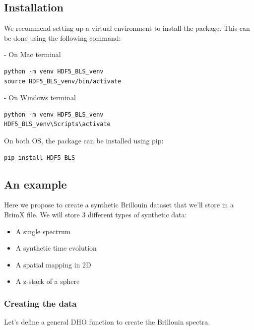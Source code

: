 \documentclass{article}
\begin{document}
\subsection{Installation}

We recommend setting up a virtual environment to install the package. This can be done using the following command:

\begin{tcolorbox}[colback=blue!5, colframe=blue!40!black, boxrule=0.5mm, sharp corners, left=2mm, right=2mm, top=1mm, bottom=1mm]
- On Mac terminal
\begin{lstlisting}
python -m venv HDF5_BLS_venv
source HDF5_BLS_venv/bin/activate 
\end{lstlisting}
\end{tcolorbox}

\begin{tcolorbox}[colback=yellow!5, colframe=yellow!40!black, boxrule=0.5mm, sharp corners, left=2mm, right=2mm, top=1mm, bottom=1mm]
- On Windows terminal
\begin{lstlisting}
python -m venv HDF5_BLS_venv
HDF5_BLS_venv\Scripts\activate
\end{lstlisting}
\end{tcolorbox}

On both OS, the package can be installed using pip:
\begin{lstlisting}
pip install HDF5_BLS
\end{lstlisting}


\subsection{An example}

Here we propose to create a synthetic Brillouin dataset that we'll store in a BrimX file. We will store 3 different types of synthetic data:
\begin{itemize}
    \item A single spectrum 
    \item A synthetic time evolution
    \item A spatial mapping in 2D
    \item A z-stack of a sphere
\end{itemize}

\subsubsection{Creating the data}

Let's define a general DHO function to create the Brillouin spectra.
\end{document}
